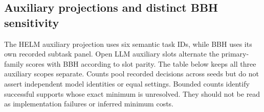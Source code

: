 \documentclass{article}
\begin{document}
\subsection{Auxiliary projections and distinct BBH sensitivity}
The HELM auxiliary projection uses six semantic task IDs, while BBH uses its own recorded subtask panel. Open LLM auxiliary slots alternate the primary-family scores with BBH according to slot parity. The table below keeps all three auxiliary scopes separate. Counts pool recorded decisions across seeds but do not assert independent model identities or equal settings. Bounded counts identify successful supports whose exact minimum is unresolved. They should not be read as implementation failures or inferred minimum costs.
\end{document}

